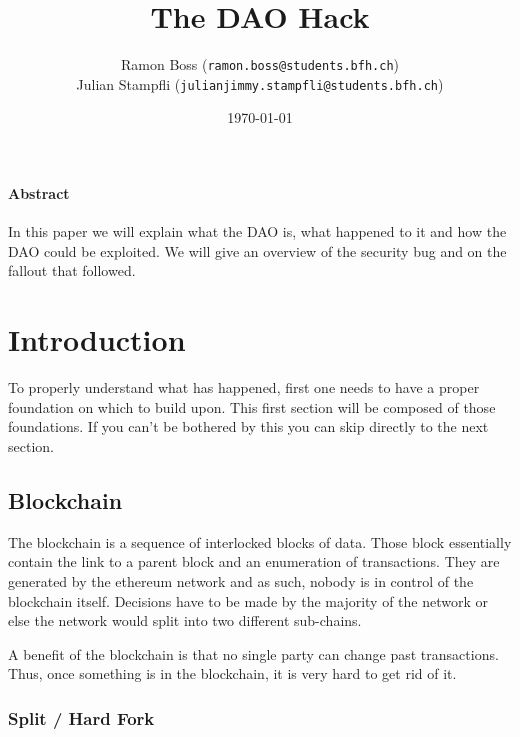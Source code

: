 \documentclass[a4paper, 11pt]{scrartcl}
\begin{document}
\title{The DAO Hack}
\date{\today}   %
\author{
  Ramon Boss (\texttt{ramon.boss@students.bfh.ch}) \\
  Julian Stampfli (\texttt{julianjimmy.stampfli@students.bfh.ch})
}

\maketitle

\paragraph{Abstract}

In this paper we will explain what the DAO is, what happened to it and how the DAO could be exploited.
We will give an overview of the security bug and on the fallout that followed.

\setcounter{tocdepth}{2}
\tableofcontents
\clearpage

\section{Introduction}

To properly understand what has happened, first one needs to have a proper foundation on which to build upon.
This first section will be composed of those foundations.
If you can't be bothered by this you can skip directly to the next section.

\subsection{Blockchain}

The blockchain is a sequence of interlocked blocks of data.
Those block essentially contain the link to a parent block and an enumeration of transactions.
They are generated by the ethereum network and as such, nobody is in control of the blockchain itself.
Decisions have to be made by the majority of the network or else the network would split into two different sub-chains. \cite{blockchainKai}

A benefit of the blockchain is that no single party can change past transactions.
Thus, once something is in the blockchain, it is very hard to get rid of it. \cite{blockchainKai}

\subsubsection{Split / Hard Fork}
\end{document}
